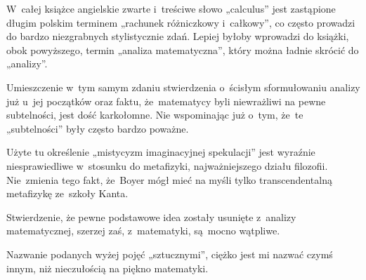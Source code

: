 \documentclass[a4paper,11pt]{article}
\numberwithin{equation}{section}
\begin{document}
\label{sec:Boyer-Historia-rachunku-etc}



\vspace{0em}


\noindent
W~całej książce angielskie zwarte i~treściwe słowo „calculus”
jest zastąpione długim polskim terminem „rachunek różniczkowy
i~całkowy”, co często prowadzi do bardzo niezgrabnych stylistycznie
zdań. Lepiej byłoby wprowadzi do książki, obok powyższego, termin
„analiza matematyczna”, który można ładnie skrócić do „analizy”.

\VerSpaceFour






\vspace{0em}


\noindent
{} Umieszczenie w~tym samym zdaniu stwierdzenia
o~ścisłym sformułowaniu analizy już u~jej początków oraz faktu,
że~matematycy byli niewrażliwi na pewne subtelności, jest dość
karkołomne. Nie wspominając już o~tym, że~te „subtelności” były
często bardzo poważne.

\VerSpaceFour





\noindent
{} Użyte tu określenie „mistycyzm imaginacyjnej
spekulacji” jest wyraźnie niesprawiedliwe w~stosunku do metafizyki,
najważniejszego działu filozofii. Nie~zmienia tego fakt, że~Boyer mógł
mieć na myśli tylko transcendentalną metafizykę ze~szkoły Kanta.

\VerSpaceFour





\noindent
{} Stwierdzenie, że pewne podstawowe idea zostały usunięte z~analizy
matematycznej, szerzej zaś, z~matematyki, są~mocno wątpliwe.

\VerSpaceFour





\noindent
{} Nazwanie podanych wyżej pojęć „sztucznymi”, ciężko jest
mi nazwać czymś innym, niż nieczułością na piękno matematyki.

\VerSpaceFour
\end{document}
